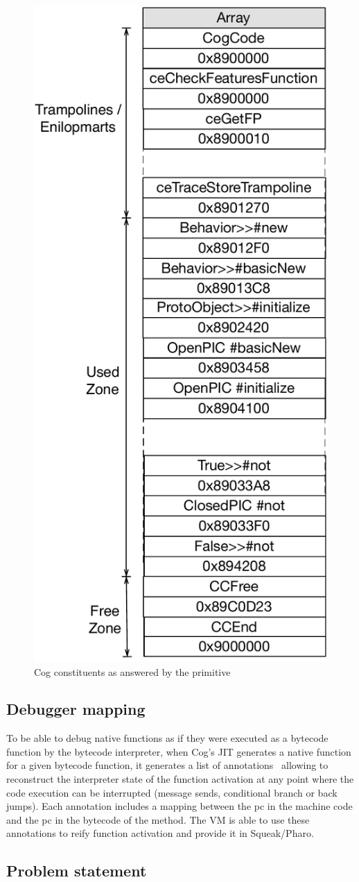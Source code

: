 \documentclass[10pt,preprint]{sigplanconf}
\newcommand{\figlabel}[1]{\label{fig:#1}}
\begin{document}
 \begin{figure}[!htp]
     \begin{center}
         \includegraphics[width=0.4\linewidth]{ContentsOfCollectCogCodePrim}
         \caption{Cog constituents as answered by the primitive}
         \figlabel{fig:ContentsOfCollectCogCodePrim}
     \end{center}
 \end{figure}

 
\subsection{Debugger mapping}

To be able to debug native functions as if they were executed as a bytecode function by the bytecode interpreter, when Cog's JIT generates a native function for a given bytecode function, it generates a list of annotations~\cite{Ber16d} allowing to reconstruct the interpreter state of the function activation at any point where the code execution can be interrupted (message sends, conditional branch or back jumps). Each annotation includes a mapping between the pc in the machine code and the pc in the bytecode of the method. The VM is able to use these annotations to reify function activation and provide it in Squeak/Pharo.
 
\subsection{Problem statement}
\end{document}
